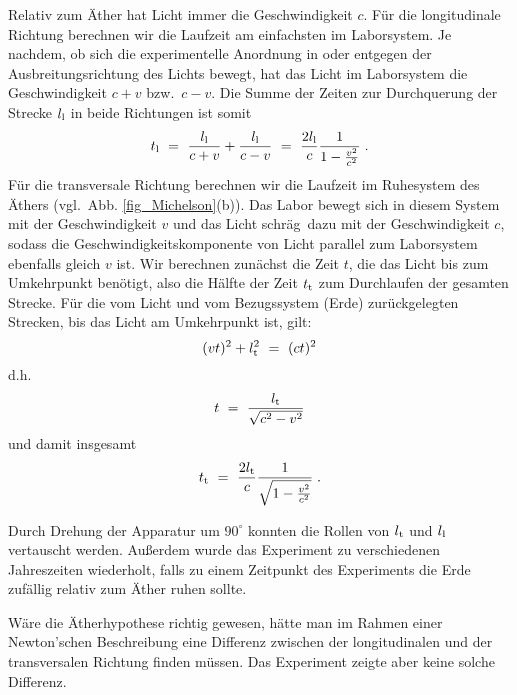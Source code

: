 Relativ zum \"Ather hat Licht immer die Geschwindigkeit $c$.
F\"ur die longitudinale Richtung berechnen wir die Laufzeit am einfachsten
im Laborsystem. Je nachdem, ob sich die experimentelle Anordnung 
in oder entgegen
der Ausbreitungsrichtung des Lichts bewegt, hat das Licht im Labor\-sys\-tem 
die Geschwindigkeit $c+v$ bzw.\ $c-v$. Die Summe der Zeiten zur 
Durchquerung der Strecke $l_{\rm l}$ in beide Richtungen ist somit
\begin{equation}
\label{MM1}
      t_{\rm l} ~=~ \frac{l_{\rm l}}{c+v} + \frac{l_{\rm l}}{c-v} 
       ~=~ \frac{2l_{\rm l}}{c} \frac{1}{1-\frac{v^2}{c^2}}  \;. 
\end{equation}
F\"ur die transversale Richtung berechnen wir die Laufzeit im Ruhesystem
des \"Athers (vgl.\ Abb. \ref{fig_Michelson}(b)). 
Das Labor bewegt sich in diesem System mit der Geschwindigkeit
$v$ und das Licht \glqq schr\"ag\grqq\ dazu mit der Geschwindigkeit $c$, sodass
die Geschwindigkeitskomponente von Licht parallel zum Laborsystem ebenfalls
gleich $v$ ist. Wir berechnen zun\"achst die Zeit $t$,
die das Licht bis zum Umkehrpunkt ben\"otigt, also die H\"alfte der 
Zeit $t_{\rm t}$ zum Durchlaufen der gesamten Strecke.
F\"ur die vom Licht und vom Bezugssys\-tem (Erde) zur\"uckgelegten 
Strecken, bis das Licht am Umkehrpunkt ist, gilt: 
\[      (vt)^2 + l_{\rm t}^2 ~=~ (ct)^2   \]
d.h.\
\[      t ~=~ \frac{l_{\rm t}}{\sqrt{c^2- v^2}}  \]
und damit insgesamt
\begin{equation}
\label{MM2} 
    t_{\rm t} ~=~  
    \frac{ 2 l_{\rm t}}{c} \frac{1}{\sqrt{1-\frac{v^2}{c^2}}}  \;. 
\end{equation}    

Durch Drehung der Apparatur um $90^\circ$ konnten die Rollen von
$l_{\rm t}$ und $l_{\rm l}$ vertauscht werden. Au\ss erdem wurde das 
Experiment zu verschiedenen Jahreszeiten wiederholt, falls zu einem 
Zeitpunkt des Experiments die Erde zuf\"allig relativ zum \"Ather ruhen 
sollte. 

W\"are die \"Atherhypothese richtig gewesen, h\"atte man
im Rahmen einer Newton'schen Beschreibung
eine Differenz zwischen der longitudinalen und der transversalen 
Richtung finden m\"ussen. Das Experiment zeigte aber keine solche 
Differenz. 

